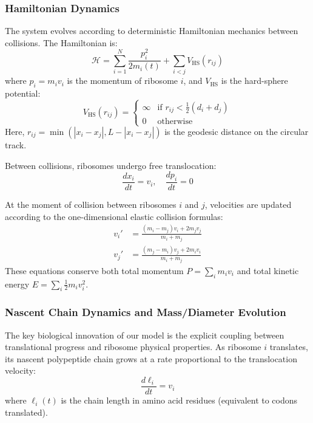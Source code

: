 \documentclass[11pt]{article}
\begin{document}
\subsubsection{Hamiltonian Dynamics}

The system evolves according to deterministic Hamiltonian mechanics between collisions. The Hamiltonian is:
\begin{equation}
    \mathcal{H} = \sum_{i=1}^{N} \frac{p_i^2}{2m_i(t)} + \sum_{i<j} V_{\text{HS}}(r_{ij})
\end{equation}
where $p_i = m_i v_i$ is the momentum of ribosome $i$, and $V_{\text{HS}}$ is the hard-sphere potential:
\begin{equation}
    V_{\text{HS}}(r_{ij}) = 
    \begin{cases}
        \infty & \text{if } r_{ij} < \frac{1}{2}(d_i + d_j) \\
        0 & \text{otherwise}
    \end{cases}
\end{equation}
Here, $r_{ij} = \min(|x_i - x_j|, L - |x_i - x_j|)$ is the geodesic distance on the circular track.

Between collisions, ribosomes undergo free translocation:
\begin{equation}
    \frac{dx_i}{dt} = v_i, \quad \frac{dp_i}{dt} = 0
\end{equation}

At the moment of collision between ribosomes $i$ and $j$, velocities are updated according to the one-dimensional elastic collision formulas:
\begin{align}
    v_i' &= \frac{(m_i - m_j)v_i + 2m_j v_j}{m_i + m_j} \\
    v_j' &= \frac{(m_j - m_i)v_j + 2m_i v_i}{m_i + m_j}
\end{align}
These equations conserve both total momentum $P = \sum_i m_i v_i$ and total kinetic energy $E = \sum_i \frac{1}{2}m_i v_i^2$.

\subsubsection{Nascent Chain Dynamics and Mass/Diameter Evolution}

The key biological innovation of our model is the explicit coupling between translational progress and ribosome physical properties. As ribosome $i$ translates, its nascent polypeptide chain grows at a rate proportional to the translocation velocity:
\begin{equation}
    \frac{d\ell_i}{dt} = v_i
\end{equation}
where $\ell_i(t)$ is the chain length in amino acid residues (equivalent to codons translated).
\end{document}
